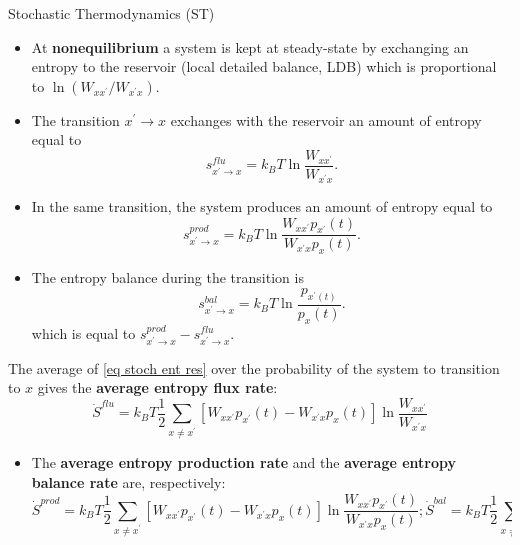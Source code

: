 \documentclass[final]{beamer}
\newlength{\colwidth}
\begin{document}
\begin{frame}[t]
\begin{columns}[t]
\begin{column}{\colwidth}
\begin{block}{Stochastic Thermodynamics (ST)}
\begin{itemize}
\item At {\bf nonequilibrium} a system is kept at steady-state by exchanging an entropy to the reservoir (local detailed balance, LDB) which is proportional to $\ln (W_{xx^\prime} / W_{x^\prime x})$\cite{10.21468/SciPostPhysLectNotes.32}.
\end{itemize}
\begin{itemize}
\justifying
\item The transition $x^\prime \rightarrow x$ exchanges with the reservoir an amount of entropy equal to
%
\begin{equation}
s^{flu}_{x^\prime \rightarrow x} = k_B T \ln \frac{W_{xx^\prime}}{W_{x^\prime x}}.
\label{eq stoch ent res}
\end{equation}
%
\item In the same transition, the system produces an amount of entropy equal to
%
\begin{equation*}
s^{prod}_{x^\prime \rightarrow x} = k_B T \ln \frac{W_{xx^\prime}p_{x^\prime}(t)}{W_{x^\prime x}p_x(t)}.
\label{eq stoch ent prod}
\end{equation*}
%
\item The entropy balance during the transition is
%
\begin{equation*}
s^{bal}_{x^\prime \rightarrow x} = k_B T \ln \frac{p_{x^\prime(t)}}{p_x(t)}.
\label{eq stoch ent bal}
\end{equation*}
%
which is equal to $s^{prod}_{x^\prime \rightarrow x} - s^{flu}_{x^\prime \rightarrow x}$.
\end{itemize}
The average of \eqref{eq stoch ent res} over the probability of the system to transition to $x$ gives the {\bf average entropy flux rate}\cite{peliti2021stochastic}:
%
\begin{equation*}
\dot{S}^{flu} = k_B T \frac{1}{2} \sum_{x \neq x^\prime} \left[ W_{xx^\prime} p_{x^\prime}(t) -  W_{x^\prime x}p_{x}(t) \right] \ln \frac{W_{xx^\prime}}{W_{x^\prime x}}
\end{equation*}
%
\begin{itemize}
\item The {\bf average entropy production rate} and the {\bf average entropy balance rate}\cite{Schnakenberg:1976aa} are, respectively:
%
\begin{subequations}
\begin{equation*}
\dot{S}^{prod}  = k_B T\frac{1}{2} \sum_{x \neq x^\prime} \left[ W_{xx^\prime} p_{x^\prime}(t) -  W_{x^\prime x}p_{x}(t) \right] \ln \frac{W_{xx^\prime}p_{x^\prime}(t)}{W_{x^\prime x} p_x(t)};
\end{equation*}
\begin{equation*}
 \dot{S}^{bal} = k_B T \frac{1}{2} \sum_{x \neq x^\prime} \left[ W_{x^\prime x} p_x(t) -  W_{x x^\prime}p_{x^\prime}(t) \right] \ln \frac{p_{x^\prime}(t)}{p_x(t)}.
\end{equation*}
\end{subequations}


\end{itemize}
\end{block}
\end{column}
\end{columns}
\end{frame}
\end{document}
